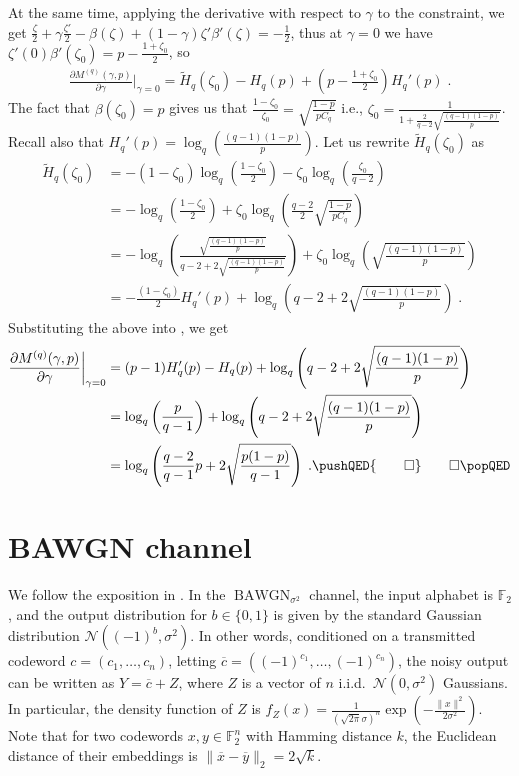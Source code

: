 \documentclass{article}
\DeclareMathOperator{\BAWGN}{BAWGN}
\theoremstyle{plain}
\theoremstyle{plain}
\theoremstyle{plain}
\theoremstyle{plain}
\theoremstyle{plain}
\theoremstyle{plain}
\theoremstyle{plain}
\theoremstyle{plain}
\theoremstyle{plain}
\theoremstyle{plain}
\theoremstyle{remark}
\theoremstyle{remark}
\theoremstyle{remark}
\theoremstyle{plain}
\begin{document}
At the same time, applying the derivative with respect to $\gamma$ to the constraint, we get $\frac{\zeta}{2}+\gamma\frac{\zeta'}{2}-\beta(\zeta)+(1-\gamma)\zeta'\beta'(\zeta)=-\frac{1}{2}$, thus at $\gamma=0$ we have $\zeta'(0)\beta'(\zeta_0)=p-\frac{1+\zeta_0}{2}$, so
\begin{align}
\label{eq:Mq_prime_0}
    \frac{\partial  M^{(q)}(\gamma,p)}{\partial \gamma}\bigg\rvert_{\gamma=0}=\tilde{H}_q(\zeta_0)-H_q(p)+\left(p-\frac{1+\zeta_0}{2}\right)H_q'(p)\;.
\end{align}
 The fact that $\beta(\zeta_0)=p$ gives us that $\frac{1-\zeta_0}{\zeta_0}=\sqrt{\frac{1-p}{p C_q}}$ i.e., $\zeta_0=\frac{1}{1+\frac{2}{q-2}\sqrt{\frac{(q-1)(1-p)}{p}}}$. Recall also that $H_q'(p)=\log_q\left(\frac{(q-1)(1-p)}{p}\right)$. Let us rewrite $\tilde{H}_q(\zeta_0)$ as 
 \begin{align*}
     \tilde{H}_q(\zeta_0)&=-(1-\zeta_0)\log_q\left(\frac{1-\zeta_0}{2}\right)-\zeta_0\log_q\left(\frac{\zeta_0}{q-2}\right)
     \\&=-\log_q\left(\frac{1-\zeta_0}{2}\right)+\zeta_0\log_q\left(\frac{q-2}{2}\sqrt{\frac{1-p}{p C_q}}\right)
     \\&=-\log_q\left(\frac{\sqrt{\frac{(q-1)(1-p)}{p}}}{q-2+2\sqrt{\frac{(q-1)(1-p)}{p}}}\right)+\zeta_0\log_q\left(\sqrt{\frac{(q-1)(1-p)}{p}}\right)
     \\&=-\frac{(1-\zeta_0)}{2}H_q'(p)+\log_q\left(q-2+2\sqrt{\frac{(q-1)(1-p)}{p}}\right)\;.
 \end{align*}
 Substituting the above into , we get
 \begin{align*}
     \frac{\partial  M^{(q)}(\gamma,p)}{\partial \gamma}\bigg\rvert_{\gamma=0}&=(p-1)H_q'(p)-H_q(p)+\log_q\left(q-2+2\sqrt{\frac{(q-1)(1-p)}{p}}\right)
     \\&=\log_q\left(\frac{p}{q-1}\right)+\log_q\left(q-2+2\sqrt{\frac{(q-1)(1-p)}{p}}\right)
     \\&=\log_q\left(\frac{q-2}{q-1}p+2\sqrt{\frac{p(1-p)}{q-1}}\right)\;.
     \pushQED{\qed}\qedhere\popQED
 \end{align*}


\section{BAWGN channel}
\label{sec:bawgn}

We follow the exposition in \cite[Section 4.1]{RU08}.
In the $\BAWGN_{\sigma^2}$ channel, the input alphabet
is $\mathbb{F}_2$, and the output distribution for $b\in\{0,1\}$
is given by the standard Gaussian distribution $\mathcal{N}((-1)^b, \sigma^2)$. In other words, conditioned on a transmitted codeword
$c=(c_1,\ldots,c_n)$, letting 
$\overline{c}=((-1)^{c_1},\ldots,(-1)^{c_n})$, the noisy output
can be written as $Y=\overline{c}+Z$, where $Z$ is a vector
of $n$ i.i.d.~$\mathcal{N}(0,\sigma^2)$ Gaussians. In particular,
the density function of $Z$ is 
$f_Z(x)=\frac{1}{\left(\sqrt{2\pi}\sigma\right)^{n}}
\exp\left(-\frac{\|x\|^2}{2\sigma^2}\right)$.
Note that for two codewords $x,y\in\mathbb{F}_2^n$ with
Hamming distance $k$, the Euclidean distance of their embeddings
is $\|\overline{x}-\overline{y}\|_2=2\sqrt{k}$. 
\end{document}
